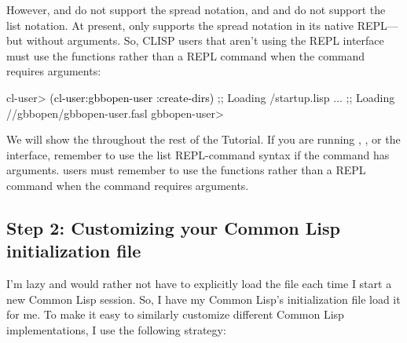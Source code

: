 \documentclass[10pt,twoside,english,pdftex]{article}
\begin{document}
However,  and
 do not support the spread
notation, and  and
 do not support the list
notation.  At present,  only supports
the spread notation in its native REPL---but without arguments.  So, CLISP
users that aren't using the
 REPL interface must
use the  functions rather than a REPL command when the
command requires arguments:
%
\W\supp
\begin{example}
\textcolor{darkergray}{%
  cl-user> \textcolor{black}{(cl-user:gbbopen-user :create-dirs)}
  ;; Loading /startup.lisp
     ...
  ;; Loading //gbbopen/gbbopen-user.fasl
  gbbopen-user>}
\end{example}
%
We will show the  throughout
the rest of the Tutorial.  If you are running ,
, or the
 interface, remember
to use the list REPL-command syntax if the command has arguments.
 users must remember to use the
 functions rather than a REPL command when the command
requires arguments.

\subsection*{Step 2: Customizing your Common Lisp initialization file}

I'm lazy and would rather not have to explicitly load the
 file each time I start a new
Common Lisp session.  So, I have my Common Lisp's initialization file load it
for me.  To make it easy to similarly customize different Common Lisp
implementations, I use the following strategy:
\end{document}

